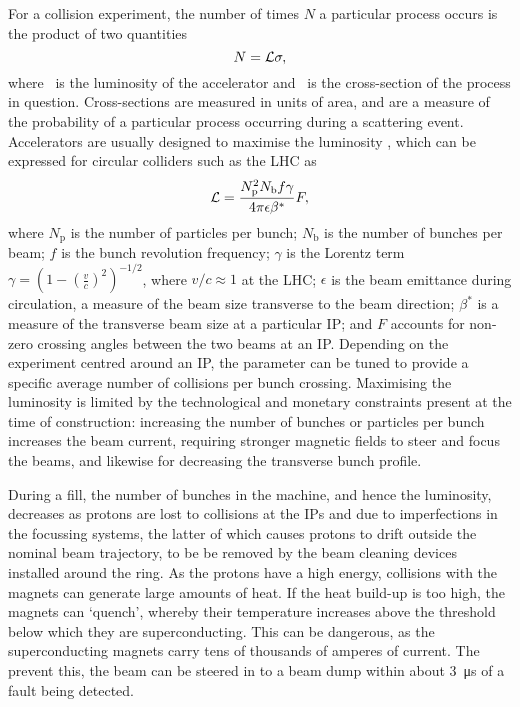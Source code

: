 For a collision experiment, the number of times $N$ a particular process occurs 
is the product of two quantities
\begin{equation}
  N = \mathcal{L}\sigma,
  \label{eqn:intro:lhc:lumi_xsec}
\end{equation}
where \lumi\ is the luminosity of the accelerator and \xsec\ is the 
cross-section of the process in question.
Cross-sections are measured in units of area, and are a measure of the 
probability of a particular process occurring during a scattering event.
Accelerators are usually designed to maximise the luminosity \lumi, which can 
be expressed for circular colliders such as the \ac{LHC} as
\begin{equation}
  \mathcal{L} = \frac{N_{\text{p}}^{2}N_{\text{b}}f\gamma}{4\pi\epsilon\beta^{*}}F,
\end{equation}
where $N_{\text{p}}$ is the number of particles per bunch; $N_{\text{b}}$ is 
the number of bunches per beam; $f$ is the bunch revolution frequency; $\gamma$ 
is the Lorentz term $\gamma = {(1 - {(\frac{v}{c})}^{2})}^{-1/2}$, where $v/c 
\approx 1$ at the \ac{LHC}; $\epsilon$ is the beam emittance during 
circulation, a measure of the beam size transverse to the beam direction; 
$\beta^{*}$ is a measure of the transverse beam size at a particular \ac{IP}; 
and $F$ accounts for non-zero crossing angles between the two beams at an 
\ac{IP}.
Depending on the experiment centred around an \ac{IP}, the \betastar parameter 
can be tuned to provide a specific average number of collisions per bunch 
crossing.
Maximising the luminosity is limited by the technological and monetary 
constraints present at the time of construction: increasing the number of 
bunches or particles per bunch increases the beam current, requiring stronger 
magnetic fields to steer and focus the beams, and likewise for decreasing the 
transverse bunch profile.

During a fill, the number of bunches in the machine, and hence the luminosity, 
decreases as protons are lost to collisions at the \acp{IP} and due to 
imperfections in the focussing systems, the latter of which causes protons to 
drift outside the nominal beam trajectory, to be be removed by the beam 
cleaning devices installed around the ring.
As the protons have a high energy, collisions with the magnets can generate 
large amounts of heat.
If the heat build-up is too high, the magnets can `quench', whereby their 
temperature increases above the threshold below which they are superconducting.
This can be dangerous, as the superconducting magnets carry tens of thousands 
of amperes of current.
The prevent this, the beam can be steered in to a beam dump within about 
\SI{3}{\micro\second} of a fault being detected.

